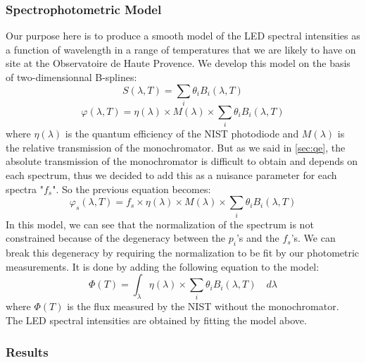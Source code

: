 \documentclass[\docopts]{\docclass}
\begin{document}
\subsubsection{Spectrophotometric Model}
\label{sec:spectromodel}
Our purpose here is to produce a smooth model of the LED spectral
intensities as a function of wavelength in a range of temperatures
that we are likely to have on site at the Observatoire de Haute
Provence. We develop this model on the basis of two-dimensionnal
B-splines:
\[
  S(\lambda, T) = \sum_i \theta_iB_i(\lambda, T)
\]
\[
  \varphi(\lambda, T) = \eta(\lambda) \times M(\lambda) \times \sum_i \theta_i B_i(\lambda, T)
\]
where $\eta(\lambda)$ is the quantum efficiency of the NIST photodiode
and $M(\lambda)$ is the relative transmission of the
monochromator. But as we said in \ref{sec:qe}, the absolute
transmission of the monochromator is difficult to obtain and depends
on each spectrum, thus we decided to add this as a nuisance parameter
for each spectra "$f_s$". So the previous equation becomes:
\[
  \varphi_s(\lambda, T) = f_s \times \eta(\lambda) \times M(\lambda)
  \times \sum_i \theta_i B_i(\lambda, T)
\]
In this model, we can see that the normalization of the spectrum is
not constrained because of the degeneracy between the $p_i$'s and the
$f_s$'s. We can break this degeneracy by requiring the normalization
to be fit by our photometric measurements. It is done by adding the
following equation to the model:
\[
  \varPhi(T) = \int_{\lambda} \eta(\lambda) \times
  \sum_i\theta_iB_i(\lambda, T) \quad d\lambda
\]
where $\varPhi(T)$ is the flux measured by the NIST without the
monochromator.\\
The LED spectral intensities are obtained by fitting the model above.

\subsubsection{Results}
\label{sec:leds_results}
\end{document}
